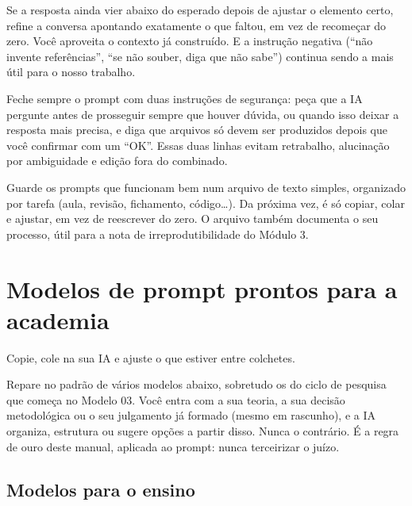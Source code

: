 \documentclass[11pt,a4paper]{article}
\begin{document}
\begin{dica}
Se a resposta ainda vier abaixo do esperado depois de ajustar o elemento certo, refine a conversa apontando exatamente o que faltou, em vez de recomeçar do zero. Você aproveita o contexto já construído. E a instrução negativa (``não invente referências'', ``se não souber, diga que não sabe'') continua sendo a mais útil para o nosso trabalho.
\end{dica}

\begin{dica}
Feche sempre o prompt com duas instruções de segurança: peça que a IA pergunte antes de prosseguir sempre que houver dúvida, ou quando isso deixar a resposta mais precisa, e diga que arquivos só devem ser produzidos depois que você confirmar com um ``OK''. Essas duas linhas evitam retrabalho, alucinação por ambiguidade e edição fora do combinado.
\end{dica}

\begin{dica}
Guarde os prompts que funcionam bem num arquivo de texto simples, organizado por tarefa (aula, revisão, fichamento, código\ldots). Da próxima vez, é só copiar, colar e ajustar, em vez de reescrever do zero. O arquivo também documenta o seu processo, útil para a nota de irreprodutibilidade do Módulo 3.
\end{dica}

\section{Modelos de prompt prontos para a academia}
Copie, cole na sua IA e ajuste o que estiver entre colchetes.
\begin{dica}
Repare no padrão de vários modelos abaixo, sobretudo os do ciclo de pesquisa que começa no Modelo 03. Você entra com a sua teoria, a sua decisão metodológica ou o seu julgamento já formado (mesmo em rascunho), e a IA organiza, estrutura ou sugere opções a partir disso. Nunca o contrário. É a regra de ouro deste manual, aplicada ao prompt: nunca terceirizar o juízo.
\end{dica}

\subsection*{Modelos para o ensino}
\end{document}
